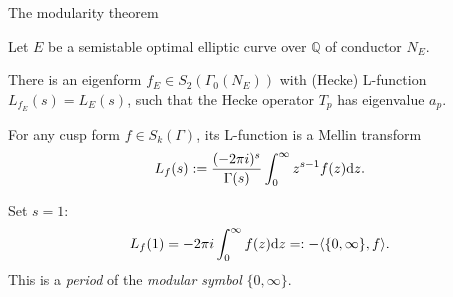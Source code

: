 \documentclass[10pt]{beamer}
\begin{document}
\begin{frame}[t]{The modularity theorem}

Let $ E $ be a semistable optimal elliptic curve over $ \mathbb{Q} $ of conductor $ N_E $.

\pause

\vspace{0.5cm}

\begin{theorem}
There is an eigenform $ f_E \in S_2(\Gamma_0(N_E)) $ with (Hecke) L-function $ L_{f_E}(s) = L_E(s) $, such that the Hecke operator $ T_p $ has eigenvalue $ a_p $.
\end{theorem}

\pause

\vspace{0.5cm} For any cusp form $ f \in S_k(\Gamma) $, its L-function is a Mellin transform
\vspace{-0.2cm} $$ \vspace{-0.2cm} L_f(s) := \dfrac{(-2\pi i)^s}{\Gamma(s)}\int_0^\infty z^{s - 1}f(z)\mathrm{d}z. $$

\pause

Set $ s = 1 $:
\vspace{-0.2cm} $$ \vspace{-0.2cm} L_f(1) = -2\pi i\int_0^\infty f(z)\mathrm{d}z =: -\langle\{0, \infty\}, f\rangle. $$
This is a \emph{period} of the \emph{modular symbol} $ \{0, \infty\} $.

\end{frame}
\end{document}
